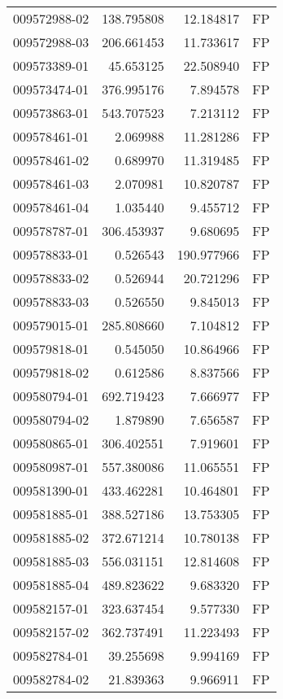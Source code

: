 \begin{tabular}{lrrl}
009572988-02 &  138.795808 &    12.184817 &   FP \\
009572988-03 &  206.661453 &    11.733617 &   FP \\
009573389-01 &   45.653125 &    22.508940 &   FP \\
009573474-01 &  376.995176 &     7.894578 &   FP \\
009573863-01 &  543.707523 &     7.213112 &   FP \\
009578461-01 &    2.069988 &    11.281286 &   FP \\
009578461-02 &    0.689970 &    11.319485 &   FP \\
009578461-03 &    2.070981 &    10.820787 &   FP \\
009578461-04 &    1.035440 &     9.455712 &   FP \\
009578787-01 &  306.453937 &     9.680695 &   FP \\
009578833-01 &    0.526543 &   190.977966 &   FP \\
009578833-02 &    0.526944 &    20.721296 &   FP \\
009578833-03 &    0.526550 &     9.845013 &   FP \\
009579015-01 &  285.808660 &     7.104812 &   FP \\
009579818-01 &    0.545050 &    10.864966 &   FP \\
009579818-02 &    0.612586 &     8.837566 &   FP \\
009580794-01 &  692.719423 &     7.666977 &   FP \\
009580794-02 &    1.879890 &     7.656587 &   FP \\
009580865-01 &  306.402551 &     7.919601 &   FP \\
009580987-01 &  557.380086 &    11.065551 &   FP \\
009581390-01 &  433.462281 &    10.464801 &   FP \\
009581885-01 &  388.527186 &    13.753305 &   FP \\
009581885-02 &  372.671214 &    10.780138 &   FP \\
009581885-03 &  556.031151 &    12.814608 &   FP \\
009581885-04 &  489.823622 &     9.683320 &   FP \\
009582157-01 &  323.637454 &     9.577330 &   FP \\
009582157-02 &  362.737491 &    11.223493 &   FP \\
009582784-01 &   39.255698 &     9.994169 &   FP \\
009582784-02 &   21.839363 &     9.966911 &   FP \\

\end{tabular}
